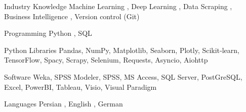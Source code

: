

\begin{cvskills}

  \cvskill
    {Industry Knowledge} %
    {Machine Learning , Deep Learning , Data Scraping , Business Intelligence , Version control (Git)} %

  \cvskill
    {Programming} %
    {Python , SQL} %

  \cvskill
    {Python Libraries} %
    {Pandas, NumPy, Matplotlib, Seaborn, Plotly, Scikit‑learn, TensorFlow, Spacy, Scrapy, Selenium, Requests, Asyncio, Aiohttp} %

  \cvskill
    {Software} %
    {Weka, SPSS Modeler, SPSS, MS Access, SQL Server, PostGreSQL, Excel, PowerBI, Tableau, Visio, Visual Paradigm} %

  \cvskill
    {Languages} %
    {Persian , English , German} %


\end{cvskills}
